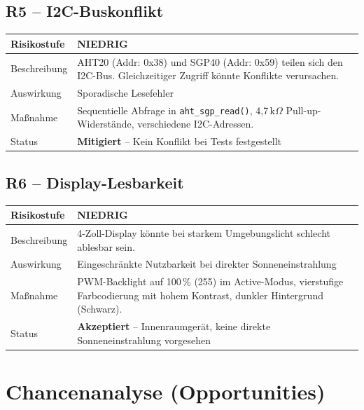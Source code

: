 \documentclass[a4paper,11pt]{article}
\begin{document}
\subsection{R5 -- I2C-Buskonflikt}

\begin{tabularx}{\textwidth}{lX}
\toprule
\rowcolor{risklow}
\textbf{Risikostufe} & \textbf{NIEDRIG} \\
\midrule
Beschreibung & AHT20 (Addr: 0x38) und SGP40 (Addr: 0x59) teilen sich den I2C-Bus. Gleichzeitiger Zugriff könnte Konflikte verursachen. \\
Auswirkung & Sporadische Lesefehler \\
Maßnahme & Sequentielle Abfrage in \texttt{aht\_sgp\_read()}, 4{,}7\,k$\Omega$ Pull-up-Widerstände, verschiedene I2C-Adressen. \\
Status & \textbf{Mitigiert} -- Kein Konflikt bei Tests festgestellt \\
\bottomrule
\end{tabularx}

\subsection{R6 -- Display-Lesbarkeit}

\begin{tabularx}{\textwidth}{lX}
\toprule
\rowcolor{risklow}
\textbf{Risikostufe} & \textbf{NIEDRIG} \\
\midrule
Beschreibung & 4-Zoll-Display könnte bei starkem Umgebungslicht schlecht ablesbar sein. \\
Auswirkung & Eingeschränkte Nutzbarkeit bei direkter Sonneneinstrahlung \\
Maßnahme & PWM-Backlight auf 100\,\% (255) im Active-Modus, vierstufige Farbcodierung mit hohem Kontrast, dunkler Hintergrund (Schwarz). \\
Status & \textbf{Akzeptiert} -- Innenraumgerät, keine direkte Sonneneinstrahlung vorgesehen \\
\bottomrule
\end{tabularx}

\section{Chancenanalyse (Opportunities)}
\end{document}
